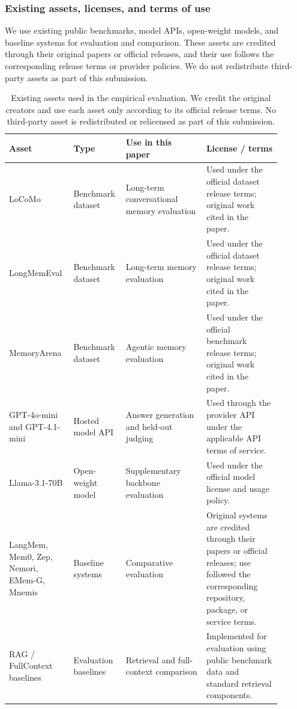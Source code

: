 \documentclass{article}
\theoremstyle{plain}
\theoremstyle{definition}
\theoremstyle{remark}
\begin{document}
\subsubsection{Existing assets, licenses, and terms of use}
\label{app:existing_assets}

We use existing public benchmarks, model APIs, open-weight models, and baseline systems for evaluation and comparison. These assets are credited through their original papers or official releases, and their use follows the corresponding release terms or provider policies. We do not redistribute third-party assets as part of this submission.

\begin{table}[h]
\centering
\small
\begin{tabular}{p{0.20\linewidth} p{0.16\linewidth} p{0.28\linewidth} p{0.26\linewidth}}
\toprule
Asset & Type & Use in this paper & License / terms \\
\midrule
LoCoMo & Benchmark dataset & Long-term conversational memory evaluation & Used under the official dataset release terms; original work cited in the paper. \\
LongMemEval & Benchmark dataset & Long-term memory evaluation & Used under the official dataset release terms; original work cited in the paper. \\
MemoryArena & Benchmark dataset & Agentic memory evaluation & Used under the official benchmark release terms; original work cited in the paper. \\
GPT-4o-mini and GPT-4.1-mini & Hosted model API & Answer generation and held-out judging & Used through the provider API under the applicable API terms of service. \\
Llama-3.1-70B & Open-weight model & Supplementary backbone evaluation & Used under the official model license and usage policy. \\
LangMem, Mem0, Zep, Nemori, EMem-G, Mnemis & Baseline systems & Comparative evaluation & Original systems are credited through their papers or official releases; use followed the corresponding repository, package, or service terms. \\
RAG / FullContext baselines & Evaluation baselines & Retrieval and full-context comparison & Implemented for evaluation using public benchmark data and standard retrieval components. \\
\bottomrule
\end{tabular}
\caption{Existing assets used in the empirical evaluation. We credit the original creators and use each asset only according to its official release terms. No third-party asset is redistributed or relicensed as part of this submission.}
\label{tab:existing_assets}
\end{table}
\end{document}
